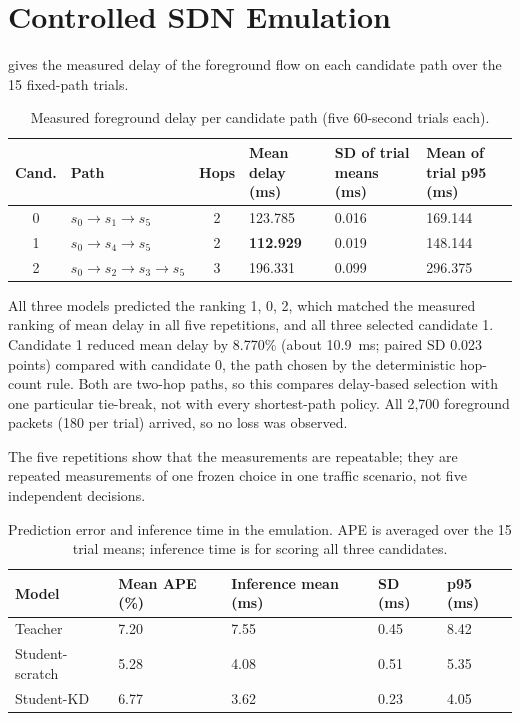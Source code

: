 \section{Controlled SDN Emulation}
\label{sec:emulation}

 gives the measured delay of the foreground flow on each candidate path over the 15 fixed-path trials.

\begin{table}[ht]
\centering
\small
\caption{Measured foreground delay per candidate path (five 60-second trials each).}
\label{tab:mininet-paths}
\begin{tabular}{@{}c l c C{22mm} C{24mm} C{24mm}@{}}
\toprule
\textbf{Cand.} & \textbf{Path} & \textbf{Hops} & \textbf{Mean delay (ms)} & \textbf{SD of trial means (ms)} & \textbf{Mean of trial p95 (ms)} \\
 & $s_0 \to s_1 \to s_5$         & 2 & 123.785 & 0.016 & 169.144 \\
1 & $s_0 \to s_4 \to s_5$         & 2 & \textbf{112.929} & 0.019 & 148.144 \\
2 & $s_0 \to s_2 \to s_3 \to s_5$ & 3 & 196.331 & 0.099 & 296.375 \\
\bottomrule
\end{tabular}
\end{table}

All three models predicted the ranking 1, 0, 2, which matched the measured ranking of mean delay in all five repetitions, and all three selected candidate 1. Candidate 1 reduced mean delay by 8.770\% (about 10.9~ms; paired SD 0.023 points) compared with candidate 0, the path chosen by the deterministic hop-count rule. Both are two-hop paths, so this compares delay-based selection with one particular tie-break, not with every shortest-path policy. All 2,700 foreground packets (180 per trial) arrived, so no loss was observed.

The five repetitions show that the measurements are repeatable; they are repeated measurements of one frozen choice in one traffic scenario, not five independent decisions.

\begin{table}[ht]
\centering
\small
\caption{Prediction error and inference time in the emulation. APE is averaged over the 15 trial means; inference time is for scoring all three candidates.}
\label{tab:mininet-models}
\begin{tabular}{@{}l C{20mm} C{24mm} C{16mm} C{16mm}@{}}
\toprule
\textbf{Model} & \textbf{Mean APE (\%)} & \textbf{Inference mean (ms)} & \textbf{SD (ms)} & \textbf{p95 (ms)} \\
\midrule
Teacher         & 7.20 & 7.55 & 0.45 & 8.42 \\
Student-scratch & 5.28 & 4.08 & 0.51 & 5.35 \\
Student-KD      & 6.77 & 3.62 & 0.23 & 4.05 \\
\bottomrule
\end{tabular}
\end{table}


